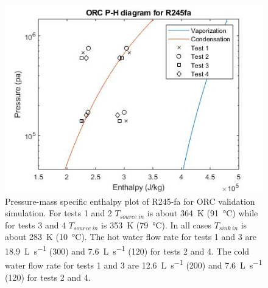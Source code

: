 \begin{figure}[p]
	\centering
	\includegraphics[width=\textwidth]{figures/VerificationPH01}
	\caption{Pressure-mass specific enthalpy plot of R245-fa for ORC validation simulation. 
	For tests 1 and 2 $T_{source\ in}$ is about \SI{364}{\kelvin} (\SI{91}{\degreeCelsius})
	while for tests 3 and 4 $T_{source\ in}$ is \SI{353}{\kelvin} (\SI{79}{\degreeCelsius}). 
	In all cases $T_{sink\ in}$ is about \SI{283}{\kelvin} (\SI{10}{\degreeCelsius}). 
	The hot water flow rate for tests 1 and 3 are \SI{18.9}{\liter\per\second} (\SI{300}{\gpm})
	and	\SI{7.6}{\liter\per\second} (\SI{120}{\gpm}) for tests 2 and 4. 
	The cold water flow rate for tests 1 and 3 are \SI{12.6}{\liter\per\second} (\SI{200}{\gpm})
	and \SI{7.6}{\liter\per\second} (\SI{120}{\gpm}) for tests 2 and 4.}
	\label{fig:verifcation_ph01}
\end{figure}